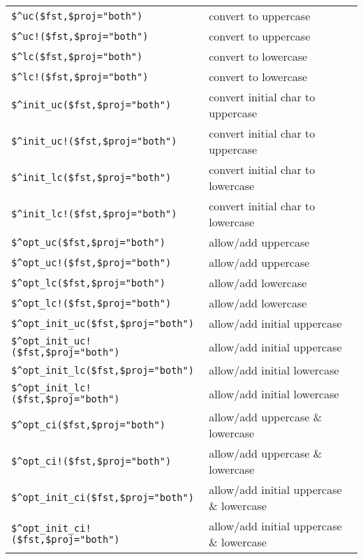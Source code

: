\noindent
\begin{tabular}{|l|l|}
\hline
\verb/$^uc($fst,/\verb!$proj="both"!\verb!)! & convert to uppercase\\
\verb/$^uc!($fst,/\verb!$proj="both"!\verb!)! & convert to uppercase\\
\verb/$^lc($fst,/\verb!$proj="both"!\verb!)! & convert to lowercase\\
\verb/$^lc!($fst,/\verb!$proj="both"!\verb!)! & convert to lowercase\\
\hline
\verb/$^init_uc($fst,/\verb!$proj="both"!\verb!)! & convert initial char to uppercase\\
\verb/$^init_uc!($fst,/\verb!$proj="both"!\verb!)! & convert initial char to uppercase\\
\verb/$^init_lc($fst,/\verb!$proj="both"!\verb!)! & convert initial char to lowercase\\
\verb/$^init_lc!($fst,/\verb!$proj="both"!\verb!)! & convert initial char to lowercase\\
\hline
\verb/$^opt_uc($fst,/\verb!$proj="both"!\verb!)! & allow/add uppercase\\
\verb/$^opt_uc!($fst,/\verb!$proj="both"!\verb!)! & allow/add uppercase\\
\verb/$^opt_lc($fst,/\verb!$proj="both"!\verb!)! & allow/add lowercase\\
\verb/$^opt_lc!($fst,/\verb!$proj="both"!\verb!)! & allow/add lowercase\\
\hline
\verb/$^opt_init_uc($fst,/\verb!$proj="both"!\verb!)! & allow/add initial uppercase\\
\verb/$^opt_init_uc!($fst,/\verb!$proj="both"!\verb!)! & allow/add initial uppercase\\
\verb/$^opt_init_lc($fst,/\verb!$proj="both"!\verb!)! & allow/add initial lowercase\\
\verb/$^opt_init_lc!($fst,/\verb!$proj="both"!\verb!)! & allow/add initial lowercase\\
\hline
\verb/$^opt_ci($fst,/\verb!$proj="both"!\verb!)! & allow/add uppercase \& lowercase\\
\verb/$^opt_ci!($fst,/\verb!$proj="both"!\verb!)! & allow/add uppercase \& lowercase\\
\verb/$^opt_init_ci($fst,/\verb!$proj="both"!\verb!)! & allow/add initial uppercase \& lowercase\\
\verb/$^opt_init_ci!($fst,/\verb!$proj="both"!\verb!)! & allow/add initial uppercase \& lowercase\\
\hline
\end{tabular}


